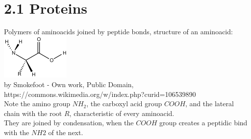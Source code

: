 \documentclass[a4paper,landscape,10pt]{cheatsheet}
\begin{document}
\hfill\\
\section*{2.1 Proteins}
Polymers of aminoacids joined by peptide bonds, structure of an aminoacid:
\includegraphics{images/amino_acid_structure}\\
{\footnotesize by Smokefoot - Own work, Public Domain, https://commons.wikimedia.org/w/index.php?curid=106539890}\\
Note the amino group $NH_2$, the carboxyl acid group $COOH$, and the lateral chain with the root $R$, characteristic of
every aminoacid.\\
They are joined by condensation, when the $COOH$ group creates a peptidic bind with the $NH2$ of the next.

\hfill\\
\end{document}
